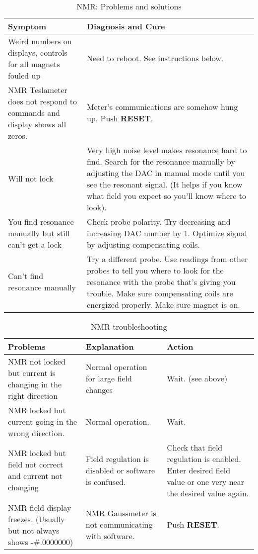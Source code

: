 {\pagebreak
{}\\
\begin{table}[htb]
\begin{tabular}{|p{}|p{}|}\hline
Symptom & Diagnosis and Cure \\ \hline\hline
Weird numbers on displays, controls for all magnets fouled up 
& Need to reboot.  See instructions below. \\ \hline
NMR Teslameter does not respond to commands and display shows all zeros. 
& Meter's communications are somehow hung up. Push {\bf RESET}. \\ \hline
Will not lock 
& Very high noise level makes resonance hard to find. Search for the resonance manually by 
  adjusting the DAC in manual mode until you see the resonant signal.  (It helps if you know 
  what field you expect so you'll know where to look). \\ \hline
You find resonance manually but still can't get a lock 
& Check probe polarity. Try decreasing and increasing DAC number by 1. Optimize signal 
  by adjusting compensating coils. \\ \hline
Can't find resonance manually 
& Try a different probe.  Use readings from other probes to tell you where to look for 
 the resonance with the probe that's giving you trouble.  Make sure
 compensating coils are energized properly.  Make sure magnet is on. \\ \hline\hline
\end{tabular}
\caption[NMR: Problems and solutions]{NMR: Problems and solutions}
\label{tab:nmr-problems-solutions}
\end{table}

\begin{table}[ht]
\begin{center}
\begin{tabular}{|p{}|p{}|p{}|}\hline
Problems & Explanation & Action \\ \hline
NMR not locked but current is changing in the right direction 
& Normal operation for large field changes  
& Wait. (see above) \\ \hline
NMR locked but current going in the wrong direction.
& Normal operation. 
& Wait. \\ \hline
NMR locked but field not correct and current not changing 
& Field regulation is disabled or software is confused.
& Check that field regulation is enabled. Enter desired field value or one
  very near the desired value again. \\ \hline
NMR field display freezes. (Usually but not always shows  -\#.0000000)
& NMR Gaussmeter is not communicating with software.
& Push {\bf RESET}. \\ \hline
\end{tabular}
\end{center}
\caption[NMR troubleshhoting]{NMR troubleshooting
}
\label{tab:hrs_nmr_2}
\end{table}

} %

